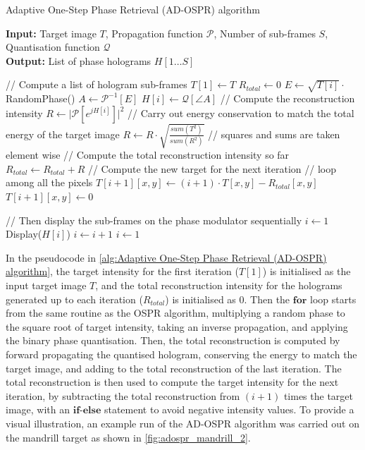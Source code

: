 \begin{algorithm}[H]
  \caption{Adaptive One-Step Phase Retrieval (AD-OSPR) algorithm}\label{alg:Adaptive One-Step Phase Retrieval (AD-OSPR) algorithm}
  \textbf{Input:} Target image $T$, Propagation function $\mathcal{P}$, Number of sub-frames $S$, Quantisation function $\mathcal{Q}$\\
  \textbf{Output:} List of phase holograms $H[1\ldots S]$
  \begin{algorithmic}
    \State // Compute a list of hologram sub-frames
    \State $T[1] \gets T$
    \State $R_{total} \gets 0$
    \State $E \gets \sqrt{T[i]} \cdot$ RandomPhase()
    \State $A \gets \mathcal{P}^{-1}[E]$
    \State $H[i] \gets \mathcal{Q}[\angle A]$
    \State // Compute the reconstruction intensity
    \State $R \gets \vert \mathcal{P}[e^{jH[i]}] \vert ^2$
    \State // Carry out energy conservation to match the total energy of the target image
    \State $R \gets R \cdot \sqrt{\frac{sum(T^2)}{sum(R^2)}} $ // squares and sums are taken element wise
    \State // Compute the total reconstruction intensity so far
    \State $R_{total} \gets R_{total} + R$
    \State // Compute the new target for the next iteration
     // loop among all the pixels
    \State $T[i+1][x,y] \gets (i+1)\cdot T[x,y] - R_{total}[x,y]$
    \Else
    \State $T[i+1][x,y] \gets 0$
    \EndIf
    \EndFor

    \EndFor
    \State // Then display the sub-frames on the phase modulator sequentially
    \State $i\gets 1$
    \State Display($H[i]$)
    \State $i\gets i + 1$
    \State $i\gets 1$
    \EndIf
    \EndWhile
  \end{algorithmic}
\end{algorithm}

In the pseudocode in \cref{alg:Adaptive One-Step Phase Retrieval (AD-OSPR) algorithm}, the target intensity for the first iteration ($T[1]$) is initialised as the input target image $T$, and the total reconstruction intensity for the holograms generated up to each iteration ($R_{total}$) is initialised as 0. Then the $\textbf{for}$ loop starts from the same routine as the OSPR algorithm, multiplying a random phase to the square root of target intensity, taking an inverse propagation, and applying the binary phase quantisation. Then, the total reconstruction is computed by forward propagating the quantised hologram, conserving the energy to match the target image, and adding to the total reconstruction of the last iteration. The total reconstruction is then used to compute the target intensity for the next iteration, by subtracting the total reconstruction from $(i+1)$ times the target image, with an $\textbf{if-else}$ statement to avoid negative intensity values. To provide a visual illustration, an example run of the AD-OSPR algorithm was carried out on the mandrill target as shown in \cref{fig:adospr_mandrill_2}.

